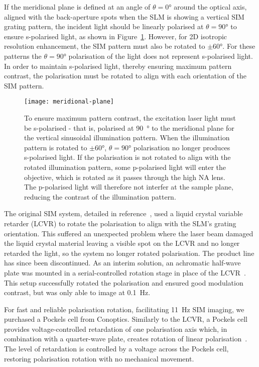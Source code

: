 If the meridional plane is defined at an angle of $\theta=0\si{\degree}$ around the optical axis, aligned with the back-aperture spots when the SLM is showing a vertical SIM grating pattern, the incident light should be linearly polarised at $\theta=90\si{\degree}$ to ensure s-polarised light, as shown in Figure~\ref{fig:meridional-plane}.
However, for 2D isotropic resolution enhancement, the SIM pattern must also be rotated to $\pm60\si{\degree}$.
For these patterns the $\theta=90\si{\degree}$ polarisation of the light does not represent s-polarised light.
In order to maintain s-polarised light, thereby ensuring maximum pattern contrast, the polarisation must be rotated to align with each orientation of the SIM pattern.

\begin{figure}[tbp]
\centering
\texttt{[image: meridional-plane]}
\caption[LAG SIM: Laser polarisation must be perpendicular to the sinusoidal illumination for high pattern contrast]{To ensure maximum pattern contrast, the excitation laser light must be s-polarised - that is, polarised at \SI{90}{\degree} to the meridional plane for the vertical sinusoidal illumination pattern. When the illumination pattern is rotated to $\pm60\si{\degree}$, $\theta=90\si{\degree}$ polarisation no longer produces s-polarised light. If the polarisation is not rotated to align with the rotated illumination pattern, some p-polarised light will enter the objective, which is rotated as it passes through the high NA lens. The p-polarised light will therefore not interfer at the sample plane, reducing the contrast of the illumination pattern.} \label{fig:meridional-plane}
\end{figure}

The original SIM system, detailed in reference~\cite{young2016guide}, used a liquid crystal variable retarder (LCVR) to rotate the polarisation to align with the SLM's grating orientation.
This suffered an unexpected problem where the laser beam damaged the liquid crystal material leaving a visible spot on the LCVR and no longer retarded the light, so the system no longer rotated polarisation.
The product line has since been discontinued.
As an interim solution, an achromatic half-wave plate was mounted in a serial-controlled rotation stage in place of the LCVR~\cite[\textit{ch. 8}]{hecht2017optics}.
This setup successfully rotated the polarisation and ensured good modulation contrast, but was only able to image at \SI{0.1}{\hertz}.

For fast and reliable polarisation rotation, facilitating \SI{11}{\hertz} SIM imaging, we purchased a Pockels cell from Conoptics.
Similarly to the LCVR, a Pockels cell provides voltage-controlled retardation of one polarisation axis which, in combination with a quarter-wave plate, creates rotation of linear polarisation~\cite{shaw2015high}.
The level of retardation is controlled by a voltage across the Pockels cell, restoring polarisation rotation with no mechanical movement.

